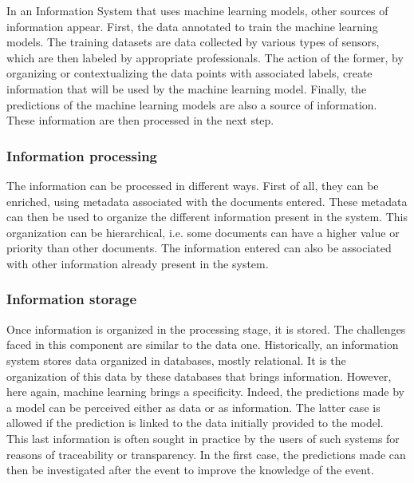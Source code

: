 In an Information System that uses machine learning models, other sources of information appear.
First, the data annotated to train the machine learning models.
The training datasets are data collected by various types of sensors, which are
then labeled by appropriate professionals.
The action of the former, by organizing or contextualizing the data points with associated
labels, create information that will be used by the machine learning model.
Finally, the predictions of the machine learning models are also a source of information.
These information are then processed in the next step.

\subsubsection{Information processing}
The information can be processed in different ways.
First of all, they can be enriched, using metadata associated with the documents entered.
These metadata can then be used to organize the different information present in the system.
This organization can be hierarchical, i.e. some documents can have a higher value or priority than other documents.
The information entered can also be associated with other information already present in the system.

\subsubsection{Information storage}
Once information is organized in the processing stage, it is stored.
The challenges faced in this component are similar to the data one.
Historically, an information system stores data organized in databases, mostly relational.
It is the organization of this data by these databases that brings information.
However, here again, machine learning brings a specificity.
Indeed, the predictions made by a model can be perceived either as data or as information.
The latter case is allowed if the prediction is linked to the data initially provided to the model.
This last information is often sought in practice by the users of such systems for reasons of traceability or transparency.
In the first case, the predictions made can then be investigated after the event to improve the knowledge of the event.

